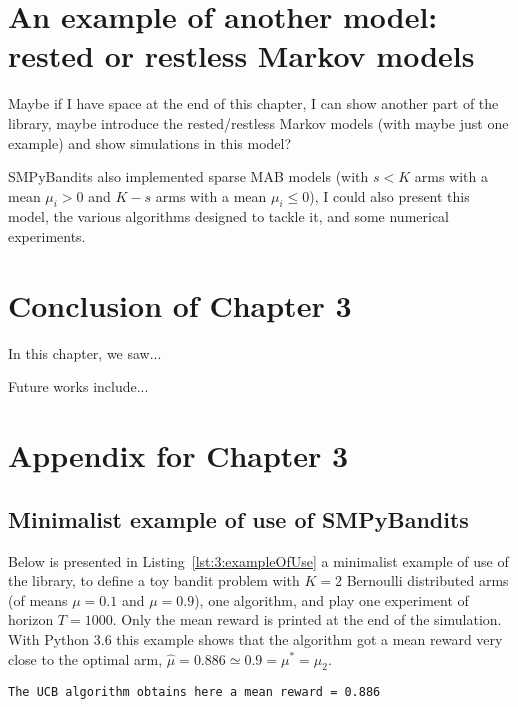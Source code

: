 \section{An example of another model: rested or restless Markov models}
\label{sec:3:markovModels}


Maybe if I have space at the end of this chapter, I can show another part of the library, maybe introduce the rested/restless Markov models (with maybe just one example) and show simulations in this model?

SMPyBandits also implemented sparse MAB models (with $s<K$ arms with a mean $\mu_i>0$ and $K-s$ arms with a mean $\mu_i \leq 0$), I could also present this model, the various algorithms designed to tackle it, and some numerical experiments.


\section{Conclusion of Chapter 3}
\label{sec:3:conclusion}

In this chapter, we saw...

Future works include...




\section{Appendix for Chapter 3}
\label{sec:3:appendix}


\subsection{Minimalist example of use of SMPyBandits}

Below is presented in Listing~\ref{lst:3:exampleOfUse} a minimalist example of use of the library, to define a toy bandit problem with $K=2$ Bernoulli distributed arms (of means $\mu=0.1$ and $\mu=0.9$), one \UCB{} algorithm, and play one experiment of horizon $T=1000$.
Only the mean reward is printed at the end of the simulation.
%
With Python 3.6 this example shows that the algorithm got a mean reward very close to the optimal arm, $\hat{\mu} = 0.886 \simeq 0.9 = \mu^* = \mu_2$.
\begin{verbatim}
The UCB algorithm obtains here a mean reward = 0.886
\end{verbatim}

